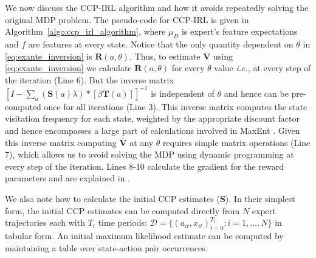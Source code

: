\documentclass{article}
\begin{document}
We now discuss the CCP-IRL algorithm and how it avoids repeatedly solving the original MDP problem.
The pseudo-code for CCP-IRL is given in Algorithm~\ref{algo:ccp_irl_algorithm}, where $\mu_D$ is expert's feature expectations and $f$ are features at every state.
Notice that the only quantity dependent on $\theta$ in \eqref{eq:exante_inversion} is $\mathbf{R}(a, \theta)$.
Thus, to estimate $\mathbf{\overline{V}}$ using \eqref{eq:exante_inversion} we calculate $\mathbf{R}(a, \theta)$ for every $\theta$ value \emph{i.e.}, at every step of the iteration (Line 6).
But the inverse matrix $\left[I-\sum_{a}(\mathbf{S}(a) \lambda) *\left[ \beta \mathbf{T}(a)  \right]\right]^{-1}$ is independent of $\theta$ and hence can be pre-computed once for all iterations (Line 3).
This inverse matrix computes the state visitation frequency for each state, weighted by the appropriate discount factor and hence encompasses a large part of calculations involved in MaxEnt \cite{ziebart_phd}.
Given this inverse matrix computing $\mathbf{\overline{V}}$ at any $\theta$ requires simple matrix operations (Line 7), which allows us to avoid solving the MDP using dynamic programming at every step of the iteration.
Lines 8-10 calculate the gradient for the reward parameters and are explained in \cite{kitani2012activity}.

We also note how to calculate the initial CCP estimates ($\mathbf{S}$). In their simplest form, the initial CCP estimates can be computed directly from $N$ expert trajectories each with $T_i$ time periods:  $\mathcal{D} = \{(a_{it},x_{it})_{t=0}^{T_i}:i=1,\dots,N\}$ in tabular form. An initial maximum likelihood estimate can be computed by maintaining a table over state-action pair occurrences.

\end{document}

